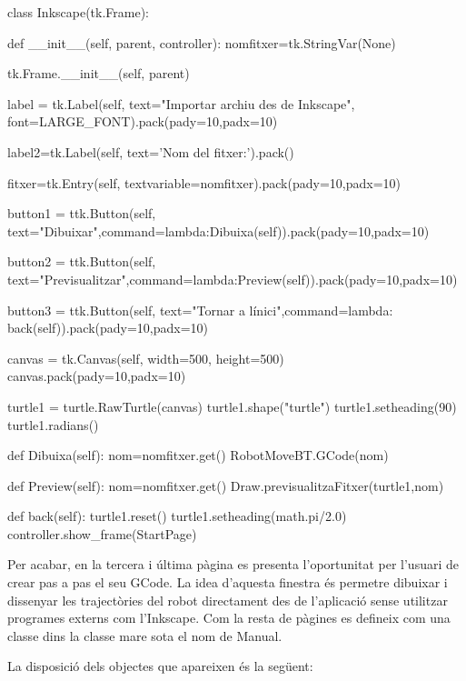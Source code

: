 \begin{python}
	class Inkscape(tk.Frame):
	
		def __init__(self, parent, controller):
			nomfitxer=tk.StringVar(None)
			
			tk.Frame.__init__(self, parent)
			
			
			label = tk.Label(self, text="Importar archiu des de Inkscape", font=LARGE_FONT).pack(pady=10,padx=10)
			
			label2=tk.Label(self, text='Nom del fitxer:').pack()
			
			fitxer=tk.Entry(self, textvariable=nomfitxer).pack(pady=10,padx=10)
			
			button1 = ttk.Button(self, text="Dibuixar",command=lambda:Dibuixa(self)).pack(pady=10,padx=10)
			
			button2 = ttk.Button(self, text="Previsualitzar",command=lambda:Preview(self)).pack(pady=10,padx=10)
			
			button3 = ttk.Button(self, text="Tornar a l\'inici",command=lambda: back(self)).pack(pady=10,padx=10)
			
			canvas = tk.Canvas(self, width=500, height=500)
			canvas.pack(pady=10,padx=10)
			
			turtle1 = turtle.RawTurtle(canvas)
			turtle1.shape("turtle")
			turtle1.setheading(90)
			turtle1.radians()
		
		def Dibuixa(self):
			nom=nomfitxer.get()
			RobotMoveBT.GCode(nom)
		
		def Preview(self):
			nom=nomfitxer.get()
			Draw.previsualitzaFitxer(turtle1,nom)
			
		def back(self):
			turtle1.reset()
			turtle1.setheading(math.pi/2.0)
			controller.show_frame(StartPage)
\end{python}

Per acabar, en la tercera i última pàgina es presenta l'oportunitat per l’usuari de crear pas a pas el seu GCode. La idea d’aquesta finestra és permetre dibuixar i dissenyar les trajectòries del robot directament des de l’aplicació sense utilitzar programes externs com l’Inkscape. Com la resta de pàgines es defineix com una classe dins la classe mare sota el nom de Manual. 

La disposició dels objectes que apareixen és la següent:


